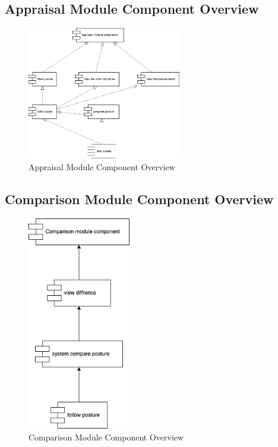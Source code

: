 \documentclass[16pt]{scrreprt}
\begin{document}
\subsection{Appraisal Module Component Overview}
\begin{figure}[H]
    \centering
    \includegraphics[width=0.6\textwidth]{diagrams/appraisal.png}
    \caption{Appraisal Module Component Overview}
\end{figure}

\subsection{Comparison Module Component Overview}
\begin{figure}[H]
    \centering
    \includegraphics[width=0.4\textwidth]{diagrams/comparison.png}
    \caption{Comparison Module Component Overview}
\end{figure}
\end{document}

